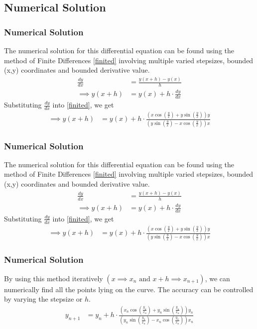 \documentclass{beamer}
\providecommand{\brak}[1]{\ensuremath{\left(#1\right)}}
\theoremstyle{remark}
\numberwithin{equation}{section}
\begin{document}
\subsection{Numerical Solution}
\begin{frame}
\frametitle{Numerical Solution}
	The numerical solution for this differential equation can be found using the method of Finite Differences \eqref{finited} involving multiple varied stepsizes, bounded (x,y) coordinates and bounded derivative value.
	\begin{align}
		\frac{dy}{dx} &= \frac{y\brak{x+h} - y\brak{x}}{h} \\
		\implies y\brak{x+h} &= y\brak{x} + h\cdot\frac{dy}{dx} \label{finited}
	\end{align}
	Substituting $\frac{dy}{dx}$ into \eqref{finited}, we get
	\begin{align}
		\implies y(x+h) &= y(x) + h\cdot\frac{ \brak{x \cos\left(\frac{y}{x}\right) + y \sin\left(\frac{y}{x}\right) }y}{\brak{y \sin\left(\frac{y}{x}\right) - x \cos\left(\frac{y}{x}\right) }x} 
	\end{align}
\end{frame}
\begin{frame}
	\frametitle{Numerical Solution}
	The numerical solution for this differential equation can be found using the method of Finite Differences \eqref{finited} involving multiple varied stepsizes, bounded (x,y) coordinates and bounded derivative value.
	\begin{align}
		\frac{dy}{dx} &= \frac{y\brak{x+h} - y\brak{x}}{h} \\
		\implies y\brak{x+h} &= y\brak{x} + h\cdot\frac{dy}{dx} \label{finited}
	\end{align}
	Substituting $\frac{dy}{dx}$ into \eqref{finited}, we get
	\begin{align}
		\implies y(x+h) &= y(x) + h\cdot\frac{ \brak{x \cos\left(\frac{y}{x}\right) + y \sin\left(\frac{y}{x}\right) }y}{\brak{y \sin\left(\frac{y}{x}\right) - x \cos\left(\frac{y}{x}\right) }x} 
	\end{align}
\end{frame}
\begin{frame}
	\frametitle{Numerical Solution}
	By using this method iteratively $\brak{x \implies x_n \text{ and } x+h \implies x_{n+1}}$, we can numerically find all the points lying on the curve. The accuracy can be controlled by varying the stepsize or $h$.
	\begin{align}
		y_{n+1} &= y_n + h\cdot\frac{ \brak{x_n \cos\left(\frac{y_n}{x_n}\right) + y_n \sin\left(\frac{y_n}{x_n}\right) }y_n}{\brak{y_n \sin\left(\frac{y_n}{x_n}\right) - x_n \cos\left(\frac{y_n}{x_n}\right) }x_n} 
	\end{align}
\end{frame}
\end{document}
